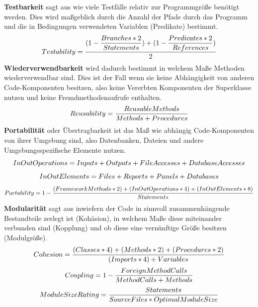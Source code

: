 \documentclass[gb,ngerman]{stthesis}
\begin{document}
			\textbf{Testbarkeit} sagt aus wie viele Testfälle relativ zur Programmgröße benötigt werden. Dies wird maßgeblich durch die Anzahl der Pfade durch das Programm und die in Bedingungen verwendeten Variablen (Predikate) bestimmt. 
			\begin{equation}
				\small{Testability = \dfrac{(1 - \dfrac{Branches * 2}{Statements}) + (1-\dfrac{Predicates * 2}{References})}{2}} 
			\end{equation} 
			\textbf{Wiederverwendbarkeit} wird dadurch bestimmt in welchem Maße Methoden wiederverwendbar sind. Dies ist der Fall wenn sie keine Abhängigkeit von anderen Code-Komponenten besitzen, also keine Vererbten Komponenten der Superklasse nutzen und keine Fremdmethodenaufrufe enthalten.
			\begin{equation}
				\small{Reusability = \dfrac{ReusableMethods}{Methods + Procedures}} 
			\end{equation} 
			\textbf{Portabilität} oder Übertragbarkeit ist das Maß wie abhängig Code-Komponenten von ihrer Umgebung sind, also Datenbanken, Dateien und andere Umgebungsspezifische Elemente nutzen.
			\begin{equation}
				\small{InOutOperations = Inputs + Outputs + FileAccesses + DatabaseAccesses} 
			\end{equation} 
			\begin{equation}
				\small{InOutElements = Files + Reports + Panels + Databases} 
			\end{equation} 
			\begin{equation}
				\small{Portability = 1 - \dfrac{(FrameworkMethods * 2) + (InOutOperations * 4) + (InOutElements * 8)}{Statements}} 
			\end{equation} 
			\textbf{Modularität} sagt aus inwiefern der Code in sinnvoll zusammenhängende Bestandteile zerlegt ist (Kohäsion), in welchem Maße diese miteinander verbunden sind (Kopplung) und ob diese eine vernünftige Größe besitzen (Modulgröße).
			\begin{equation}
				\small{Cohesion = \dfrac{(Classes * 4) + (Methods * 2) + (Procedures * 2)}{(Imports * 4) + Variables}} 
			\end{equation} 
			\begin{equation}
				\small{Coupling = 1 - \dfrac{ForeignMethodCalls}{MethodCalls + Methods}} 
			\end{equation}
			\begin{equation}
				\small{ModuleSizeRating = \dfrac{Statements}{SourceFiles * OptimalModuleSize}} 
			\end{equation} 
\end{document}
